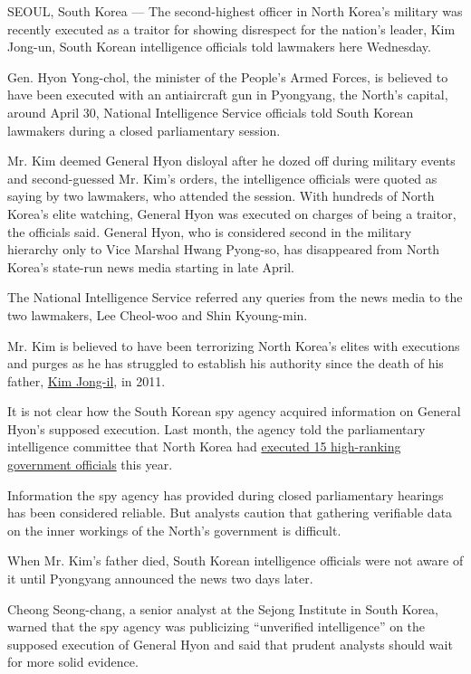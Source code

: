 SEOUL, South Korea --- The second-highest officer in North Korea's
military was recently executed as a traitor for showing disrespect for
the nation's leader, Kim Jong-un, South Korean intelligence officials
told lawmakers here Wednesday.

Gen. Hyon Yong-chol, the minister of the People's Armed Forces, is
believed to have been executed with an antiaircraft gun in Pyongyang,
the North's capital, around April 30, National Intelligence Service
officials told South Korean lawmakers during a closed parliamentary
session.

Mr. Kim deemed General Hyon disloyal after he dozed off during military
events and second-guessed Mr. Kim's orders, the intelligence officials
were quoted as saying by two lawmakers, who attended the session. With
hundreds of North Korea's elite watching, General Hyon was executed on
charges of being a traitor, the officials said. General Hyon, who is
considered second in the military hierarchy only to Vice Marshal Hwang
Pyong-so, has disappeared from North Korea's state-run news media
starting in late April.

The National Intelligence Service referred any queries from the news
media to the two lawmakers, Lee Cheol-woo and Shin Kyoung-min.

Mr. Kim is believed to have been terrorizing North Korea's elites with
executions and purges as he has struggled to establish his authority
since the death of his father,
\href{http://www.nytimes.com/2011/12/19/world/asia/kim-jong-il-is-dead.html?pagewanted=all}{Kim
Jong-il}, in 2011.

It is not clear how the South Korean spy agency acquired information on
General Hyon's supposed execution. Last month, the agency told the
parliamentary intelligence committee that North Korea had
\href{http://www.nytimes.com/2015/04/30/world/asia/north-korea-executed-15-top-officials-in-2015-south-korean-agency-says.html}{executed
15 high-ranking government officials} this year.

Information the spy agency has provided during closed parliamentary
hearings has been considered reliable. But analysts caution that
gathering verifiable data on the inner workings of the North's
government is difficult.

When Mr. Kim's father died, South Korean intelligence officials were not
aware of it until Pyongyang announced the news two days later.

Cheong Seong-chang, a senior analyst at the Sejong Institute in South
Korea, warned that the spy agency was publicizing ``unverified
intelligence'' on the supposed execution of General Hyon and said that
prudent analysts should wait for more solid evidence.

